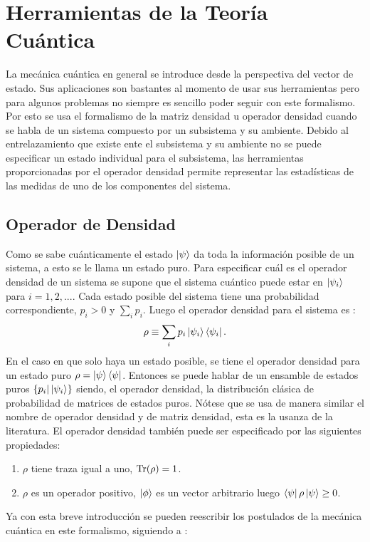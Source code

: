 \section{Herramientas de la Teoría Cuántica}
La mecánica cuántica en general se introduce desde la perspectiva del vector de estado. Sus aplicaciones son bastantes al momento de usar sus herramientas pero para algunos problemas no siempre es sencillo poder seguir con este formalismo. Por esto se usa el formalismo de la matriz densidad u operador densidad cuando se habla de un sistema compuesto por un subsistema y su ambiente. Debido al entrelazamiento que existe ente el subsistema y su ambiente no se puede especificar un estado individual para el subsistema, las herramientas proporcionadas por el operador densidad permite representar las estadísticas de las medidas de uno de los componentes del sistema.
\\
\subsection{Operador de Densidad}
Como se sabe cuánticamente el estado $\ket{\psi}$ da toda la información posible de un sistema, a esto se le llama un estado puro. Para especificar cuál es el operador densidad de un sistema se supone que el sistema cuántico puede estar en $\ket{\psi_{i}}$ para $i=1,2,...$. Cada estado posible del sistema tiene una probabilidad correspondiente, $p_{i}>0$ y $\sum_{i} p_{i}$. Luego el operador densidad para el sistema es :
\begin{equation}
\rho \equiv \sum_{i} p_{i} \ket{\psi_{i}}\bra{\psi_{i}}.
\end{equation}
En el caso en que solo haya un estado posible, se tiene el operador densidad para un estado puro $\rho= \ket{\psi}\bra{\psi}$. Entonces se puede hablar de un ensamble de estados puros $ \{ p_{i} | \ket{\psi_{i}} \} $  siendo, el operador densidad, la distribución clásica de probabilidad de matrices de estados puros. Nótese que se usa de manera similar el nombre de operador densidad y de matriz densidad, esta es la usanza de la literatura. El operador densidad también puede ser especificado por las siguientes propiedades: 

\begin{enumerate}
\item $\rho$ tiene traza igual a uno, $\Tr(\rho)=1$.

\item $\rho$ es un operador positivo, $\ket{\phi}$ es un vector arbitrario luego $\bra{\psi}\rho\ket{\psi} \geq 0$.
\end{enumerate}
Ya con esta breve introducción se pueden reescribir los postulados de la mecánica cuántica en este formalismo, siguiendo a \cite{NielsenInformation}:
\\

